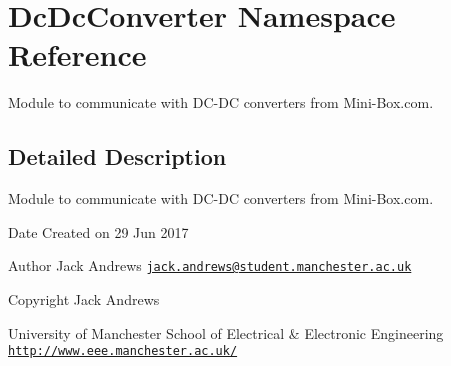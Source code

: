 \hypertarget{namespace_dc_dc_converter}{}\section{Dc\+Dc\+Converter Namespace Reference}
\label{namespace_dc_dc_converter}


Module to communicate with D\+C-\/\+DC converters from Mini-\/\+Box.\+com.  




\subsection{Detailed Description}
Module to communicate with D\+C-\/\+DC converters from Mini-\/\+Box.\+com. 

\begin{DoxyDate}{Date}
Created on 29 Jun 2017
\end{DoxyDate}
\begin{DoxyAuthor}{Author}
Jack Andrews \href{mailto:jack.andrews@student.manchester.ac.uk}{\tt jack.\+andrews@student.\+manchester.\+ac.\+uk}
\end{DoxyAuthor}
\begin{DoxyCopyright}{Copyright}
Jack Andrews 

University of Manchester School of Electrical \& Electronic Engineering \href{http://www.eee.manchester.ac.uk/}{\tt http\+://www.\+eee.\+manchester.\+ac.\+uk/} 
\end{DoxyCopyright}
